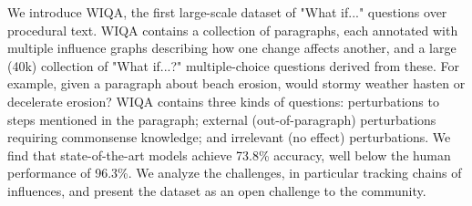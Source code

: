 We introduce WIQA, the first large-scale dataset of "What if..." questions over procedural text. WIQA contains a collection of paragraphs,
each annotated with multiple influence graphs describing how one change affects another, and a large (40k) collection of
"What if...?" multiple-choice questions derived from these. For example, given a paragraph about beach erosion, would 
stormy weather hasten or decelerate erosion? WIQA contains three kinds of questions: perturbations to steps mentioned in
the paragraph; external (out-of-paragraph) perturbations requiring commonsense knowledge; and irrelevant (no effect) perturbations.
We find that state-of-the-art models achieve 73.8\% accuracy, well below the human performance of 96.3\%. We analyze the challenges,
in particular tracking chains of influences, and present the dataset as an open challenge to the community.